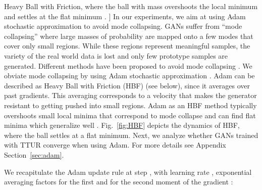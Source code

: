 \documentclass{article}
\begin{document}
\begin{figwindow}[3,r,{
\texttt{[image: figures/HBF\_ver2]}
},[Heavy Ball with Friction]{Heavy Ball with Friction,
where the ball with mass overshoots the local minimum  and settles at
the flat minimum .
  \label{fig:HBF} }]
In our experiments, we aim at using Adam stochastic approximation  to avoid mode
collapsing. GANs suffer from ``mode collapsing'' where large masses of
probability are mapped onto a few modes that cover only small regions.
While these regions represent meaningful samples, the variety of the real world
data is lost and only few prototype samples are generated.
Different methods have been proposed to avoid mode collapsing
\cite{Che:17,Metz:16}. We obviate mode collapsing by using Adam stochastic
approximation \cite{Kingma:14}. Adam can be described as Heavy Ball with
Friction (HBF) (see below), since it averages over past gradients.
This averaging corresponds to a velocity that makes the generator resistant to
getting pushed into small regions. Adam as an HBF method typically overshoots
small local minima that correspond to mode collapse and can find flat minima
which generalize well \cite{Hochreiter:97nc1}. Fig.~\ref{fig:HBF} depicts the
dynamics of HBF, where the ball settles at a flat minimum. Next, we analyze
whether GANs trained with TTUR converge when using Adam. For more details see
Appendix Section~\ref{sec:adam}.
\end{figwindow}

We recapitulate the Adam update rule at step , with learning rate ,
exponential averaging factors  for the first and 
for the second moment of the gradient :
\end{document}
